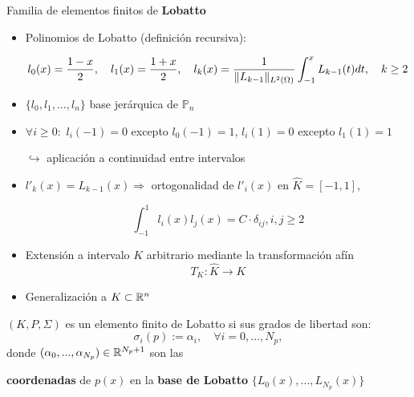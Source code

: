 \documentclass[9pt,leqno]{beamer}
\newcommand{\Np}{{N_p}}
\newcommand{\refelem}{\widehat}
\begin{document}
\begin{frame}{Familia de elementos finitos de \textbf{Lobatto}}
  \small
  \begin{itemize}
  \item Polinomios de Lobatto (definición recursiva):
    \begin{footnotesize}
      \begin{align*}
        l_0(x)=\frac{1-x}2, \quad l_1(x)=\frac{1+x}2,
        \quad l_{k}(x) = \frac 1{\norm[L^2(\Omega)]{L_{k-1}}} \int_{-1}^x L_{k-1}(t) dt, \quad k\ge 2
      \end{align*}
    \end{footnotesize}
  \item $\{l_0,l_1,\dots,l_n\}$ base jerárquica de $\mathbb{P}_n$
  \item $\forall i\ge 0:$ \quad $l_i(-1)=0$ excepto \alert{$l_0(-1)=1$},
    \quad $l_i(1)=0$ excepto \alert{$l_1(1)=1$}
    \begin{flushright}
      \scriptsize
      $\hookrightarrow$ aplicación a \alert{continuidad} entre intervalos
    \end{flushright}
  \item $l'_k(x)=L_{k-1}(x) \Rightarrow$ \alert{ortogonalidad de $l'_i(x)$} en
    $\refelem K=[-1,1]$,
    \begin{footnotesize}
      $$\int_{-1}^1 l_i(x) l_j(x) = C\cdot \delta_{ij}, i,j\ge 2$$
    \end{footnotesize}

  \item \footnotesize Extensión a intervalo $K$ arbitrario mediante la transformación afín
    $$T_K : \refelem K \to K$$
  \item \footnotesize Generalización a $K\subset\Rset^n$~\cite{solin_higher-order_2004}
  \end{itemize}
  \vspace{-0.3em}
  \normalsize
  \begin{definition} $(K,P,\Sigma)$ es un \alert{elemento finito de
      Lobatto} si sus grados de libertad son:
    \vspace{-0.2em}
    $$
    \sigma_i(p) := \alpha_i, \quad \forall i=0,...,\Np,
    $$
    \vspace{-0.2em}
    donde $(\alpha_0,...,\alpha_\Np) \in\Rset^{\Np+1}$ son las
    \vspace{-0.2em}
    \begin{center}
      \textbf{coordenadas} de $p(x)$ en la \textbf{base de Lobatto}
      $\{L_0(x),...,L_\Np(x)\}$
    \end{center}
  \end{definition}
\end{frame}
\end{document}
